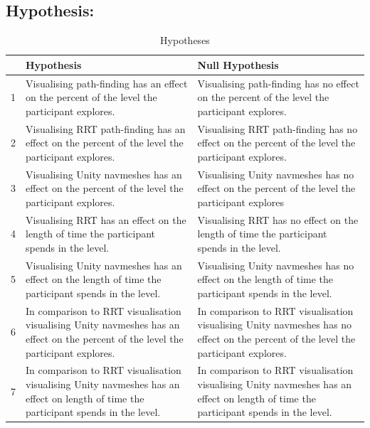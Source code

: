 \documentclass[journal]{IEEEtran}
\begin{document}
	\subsection{Hypothesis:} \label{hypothesis}
	\begin{table}[h]
		\centering
		\caption{Hypotheses}
		\label{table:Hypothesis}
		\def\arraystretch{1.5}
		\begin{tabular}{|c|p{7.5cm}|p{7.5cm}|}
			\hline
			& \textbf{Hypothesis}& \textbf{Null Hypothesis} \\
			\hline
			1 & Visualising path-finding has an effect on the percent of the level the participant explores.
			& Visualising path-finding has no effect on the percent of the level the participant explores.
			\\ \hline
			
			2 & Visualising RRT path-finding has an effect on the percent of the level the participant explores.
			& Visualising RRT path-finding has no effect on the percent of the level the participant explores.
			\\ \hline
			
			3 & Visualising Unity navmeshes has an effect on the percent of the level the participant explores.
			& Visualising Unity navmeshes has no effect on the percent of the level the participant explores
			\\ \hline
			
			4 & Visualising RRT has an effect on the length of time the participant spends in the level. 
			& Visualising RRT has no effect on the length of time the participant spends in the level. 
			\\ \hline
			
			5 & Visualising Unity navmeshes has an effect on the length of time the participant spends in the level. 
			& Visualising Unity navmeshes has no effect on the length of time the participant spends in the level.
			\\ \hline
			
			6 & In comparison to RRT visualisation visualising Unity navmeshes has an effect on the percent of the level the participant explores.
			& In comparison to RRT visualisation visualising Unity navmeshes has no effect on the percent of the level the participant explores.
			\\ \hline
			
			7 &  In comparison to RRT visualisation visualising Unity navmeshes has an effect on length of time the participant spends in the level.         
			&   In comparison to RRT visualisation visualising Unity navmeshes has an effect on length of time the participant spends in the level.     
			\\ \hline
			

\end{tabular}
\end{table}
\end{document}
